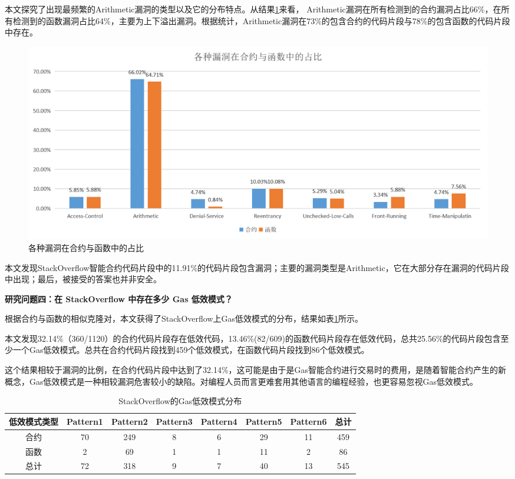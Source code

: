 本文探究了出现最频繁的Arithmetic漏洞的类型以及它的分布特点。从结果\ref{Arithmetic}来看，
Arithmetic漏洞在所有检测到的合约漏洞占比66\%，在所有检测到的函数漏洞占比64\%，主要为上下溢出漏洞。根据统计，Arithmetic漏洞在73\%的包含合约的代码片段与78\%的包含函数的代码片段中存在。

\begin{figure}[htbp]
\centering
\includegraphics[width=1\textwidth]{figures/bugCount.png}
\caption{各种漏洞在合约与函数中的占比}
\label{Arithmetic}
\end{figure}

本文发现StackOverflow智能合约代码片段中的11.91\%的代码片段包含漏洞；主要的漏洞类型是Arithmetic，它在大部分存在漏洞的代码片段中出现；最后，被接受的答案也并非安全。

\textbf{研究问题四：在 StackOverflow 中存在多少 Gas 低效模式？}

根据合约与函数的相似克隆对，本文获得了StackOverflow上Gas低效模式的分布，结果如表\ref{gasPic}所示。

本文发现32.14\%（360/1120）的合约代码片段存在低效代码，13.46\%(82/609)的函数代码片段存在低效代码，总共25.56\%的代码片段包含至少一个Gas低效模式。总共在合约代码片段找到459个低效模式，在函数代码片段找到86个低效模式。

这个结果相较于漏洞的比例，在合约代码片段中达到了32.14\%，这可能是由于是Gas智能合约进行交易时的费用，是随着智能合约产生的新概念，Gas低效模式是一种相较漏洞危害较小的缺陷。对编程人员而言更难套用其他语言的编程经验，也更容易忽视Gas低效模式。

\begin{table}[ht]
\centering

\begin{tabular}{cccccccc}
\hline
低效模式类型 & Pattern1 & Pattern2 & Pattern3 & Pattern4 & Pattern5 & Pattern6 & 总计  \\ \hline
合约     & 70       & 249      & 8        & 6        & 29       & 11       & 459 \\
函数     & 2        & 69       & 1        & 1        & 11       & 2        & 86  \\ \hline
总计     & 72       & 318      & 9        & 7        & 40       & 13       & 545 \\ \hline
\end{tabular}
\caption{StackOverflow的Gas低效模式分布}
\label{gasPic}
\end{table}

